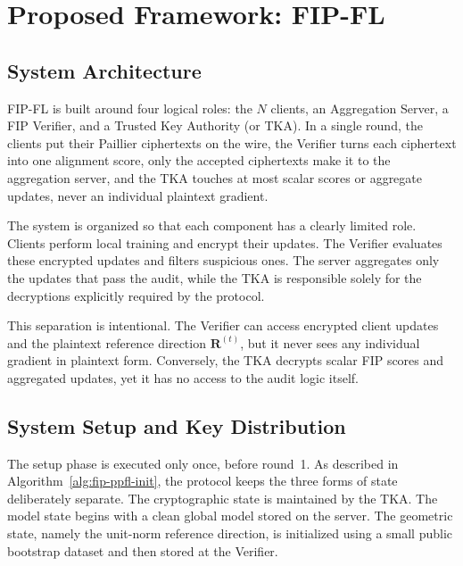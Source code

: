 \chapter{Proposed Framework: FIP-FL}
\label{FIPFL:chap:chap5}
\graphicspath{{14.Chapter5/Images/}}
\raggedbottom %

\section{System Architecture}
\label{sec:fip-arch}

FIP-FL is built around four logical roles: the $N$ clients, an Aggregation Server, a FIP Verifier, and a Trusted Key Authority (or TKA). In a single round, the clients put their Paillier ciphertexts on the wire, the Verifier turns each ciphertext into one alignment score, only the accepted ciphertexts make it to the aggregation server, and the TKA touches at most scalar scores or aggregate updates, never an individual plaintext gradient.

The system is organized so that each component has a clearly limited role. Clients perform local training and encrypt their updates. The Verifier evaluates these encrypted updates and filters suspicious ones. The server aggregates only the updates that pass the audit, while the TKA is responsible solely for the decryptions explicitly required by the protocol.

This separation is intentional. The Verifier can access encrypted client updates and the plaintext reference direction $\mathbf{R}^{(t)}$, but it never sees any individual gradient in plaintext form. Conversely, the TKA decrypts scalar FIP scores and aggregated updates, yet it has no access to the audit logic itself.

\section{System Setup and Key Distribution}
\label{sec:fip-setup}

\enlargethispage{\baselineskip}
The setup phase is executed only once, before round~1. As described in Algorithm~\ref{alg:fip-ppfl-init}, the protocol keeps the three forms of state deliberately separate. The cryptographic state is maintained by the TKA. The model state begins with a clean global model stored on the server. The geometric state, namely the unit-norm reference direction, is initialized using a small public bootstrap dataset and then stored at the Verifier.


